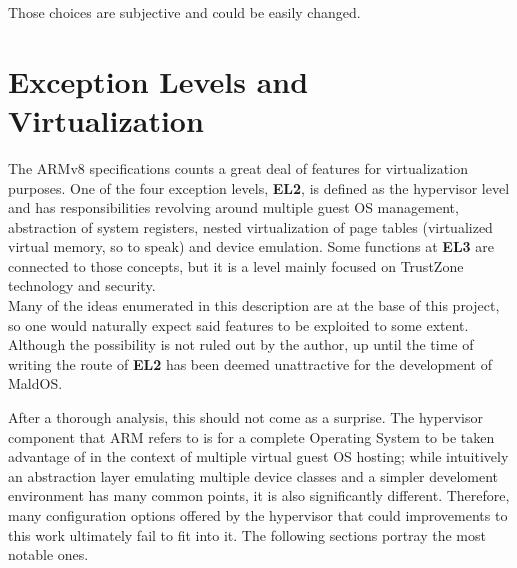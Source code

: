 \documentclass[12pt,a4paper,openright,twoside]{report}
\begin{document}
Those choices are subjective and could be easily changed.

\section{Exception Levels and Virtualization}
The ARMv8 specifications counts a great deal of features for virtualization
purposes. One of the four exception levels, \textbf{EL2}, is defined as the
hypervisor level and has responsibilities revolving around multiple guest OS management,
abstraction of system registers, nested virtualization of page tables (virtualized
virtual memory, so to speak) and device emulation. Some functions at \textbf{EL3} 
are connected to those concepts, but it is a level mainly focused on TrustZone 
technology and security. \\
Many of the ideas enumerated in this description are at the base of this project,
so one would naturally expect said features to be exploited to some extent.
Although the possibility is not ruled out by the author, up until the time of 
writing the route of \textbf{EL2} has been deemed unattractive for the development
of MaldOS.

After a thorough analysis, this should not come as a surprise. The hypervisor 
component that ARM refers to is for a complete Operating System to be taken advantage
of in the context of multiple virtual guest OS hosting; while intuitively an 
abstraction layer emulating multiple device classes and a simpler develoment 
environment has many common points, it is also significantly different. Therefore,
many configuration options offered by the hypervisor that could improvements to this
work ultimately fail to fit into it. The following sections portray the most 
notable ones.
\end{document}
